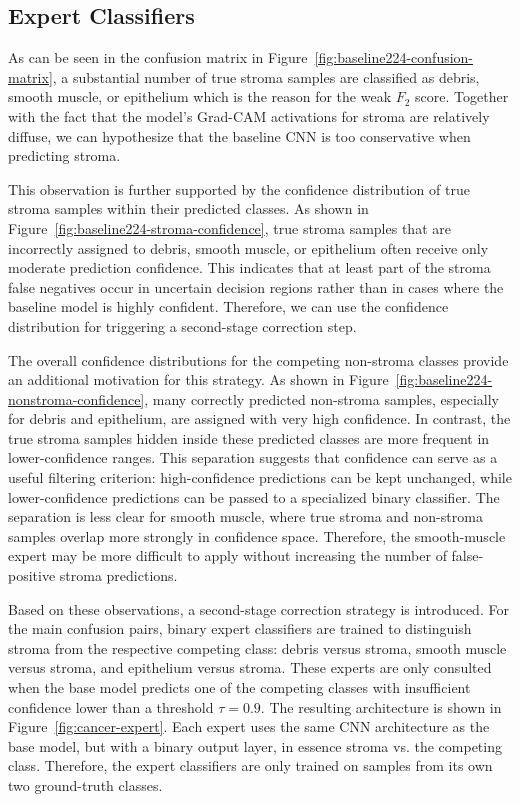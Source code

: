 \subsection{Expert Classifiers}
As can be seen in the confusion matrix in
Figure~\ref{fig:baseline224-confusion-matrix}, a substantial number of true
stroma samples are classified as debris, smooth muscle, or epithelium which is
the reason for the weak $F_2$ score. Together with the fact that the model's
Grad-CAM activations for stroma are relatively diffuse, we can hypothesize that
the baseline CNN is too conservative when predicting stroma.

This observation is further supported by the confidence distribution of true
stroma samples within their predicted classes. As shown in
Figure~\ref{fig:baseline224-stroma-confidence}, true stroma samples that are
incorrectly assigned to debris, smooth muscle, or epithelium often receive only
moderate prediction confidence. This indicates that at least part of the stroma
false negatives occur in uncertain decision regions rather than in cases where
the baseline model is highly confident. Therefore, we can use the confidence
distribution for triggering a second-stage correction step.


The overall confidence distributions for the competing non-stroma classes
provide an additional motivation for this strategy. As shown in
Figure~\ref{fig:baseline224-nonstroma-confidence}, many correctly predicted
non-stroma samples, especially for debris and epithelium, are assigned with very
high confidence. In contrast, the true stroma samples hidden inside these
predicted classes are more frequent in lower-confidence ranges. This separation
suggests that confidence can serve as a useful filtering criterion:
high-confidence predictions can be kept unchanged, while lower-confidence
predictions can be passed to a specialized binary classifier. The separation is
less clear for smooth muscle, where true stroma and non-stroma samples overlap
more strongly in confidence space. Therefore, the smooth-muscle expert may be
more difficult to apply without increasing the number of false-positive stroma
predictions.


Based on these observations, a second-stage correction strategy is introduced.
For the main confusion pairs, binary expert classifiers are trained to
distinguish stroma from the respective competing class: debris versus stroma,
smooth muscle versus stroma, and epithelium versus stroma. These experts are
only consulted when the base model predicts one of the competing classes with
insufficient confidence lower than a threshold $\tau=0.9$. The resulting
architecture is shown in Figure~\ref{fig:cancer-expert}. Each expert uses the
same CNN architecture as the base model, but with a binary output layer, in
essence stroma vs. the competing class. Therefore, the expert classifiers are
only trained on samples from its own two ground-truth classes.

